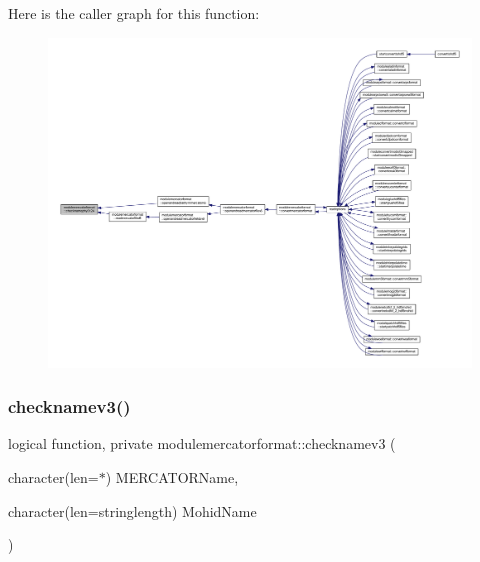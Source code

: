 Here is the caller graph for this function\+:\nopagebreak
\begin{figure}[H]
\begin{center}
\leavevmode
\includegraphics[width=350pt]{namespacemodulemercatorformat_a56d6a124d89d9acc9f4d378fbf3fc84f_icgraph}
\end{center}
\end{figure}
\mbox{\label{namespacemodulemercatorformat_aa50cf57bf22a01dde1d85b4dd1d6baa0}} 
\subsubsection{\texorpdfstring{checknamev3()}{checknamev3()}}
{\footnotesize\ttfamily logical function, private modulemercatorformat\+::checknamev3 (\begin{DoxyParamCaption}\item[{character(len=$\ast$)}]{M\+E\+R\+C\+A\+T\+O\+R\+Name,  }\item[{character(len=stringlength)}]{Mohid\+Name }\end{DoxyParamCaption})\hspace{0.3cm}{\ttfamily [private]}}

